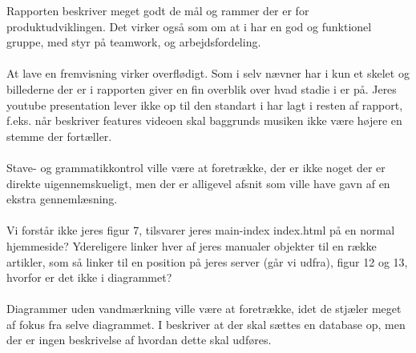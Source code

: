 \documentclass{article}
\begin{document}
Rapporten beskriver meget godt de mål og rammer der er for produktudviklingen. Det virker også som om at i har en god og funktionel gruppe, med styr på teamwork, og arbejdsfordeling.
\\\\
At lave en fremvisning virker overflødigt. Som i selv nævner har i kun et skelet og billederne der er i rapporten giver en fin overblik over hvad stadie i er på. Jeres youtube presentation lever ikke op til den standart i har lagt i resten af rapport, f.eks. når beskriver features videoen skal baggrunds musiken ikke være højere en stemme der fortæller.
\\\\
Stave- og grammatikkontrol ville være at foretrække, der er ikke noget der er direkte uigennemskueligt, men der er alligevel afsnit som ville have gavn af en ekstra gennemlæsning.
\\\\
Vi forstår ikke jeres figur 7, tilsvarer jeres main-index index.html på en normal hjemmeside? Ydereligere linker hver af jeres manualer objekter til en række artikler, som så linker til en position på jeres server (går vi udfra), figur 12 og 13, hvorfor er det ikke i diagrammet?
\\\\
Diagrammer uden vandmærkning ville være at foretrække, idet de stjæler meget af fokus fra selve diagrammet. I beskriver at der skal sættes en database op, men der er ingen beskrivelse af hvordan dette skal udføres.
\end{document}
